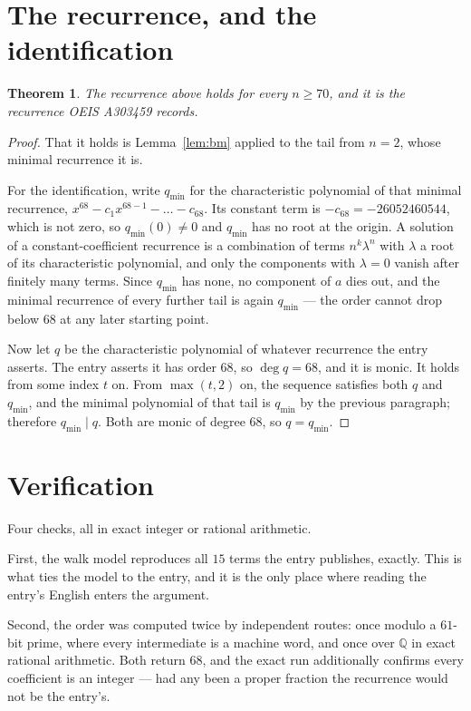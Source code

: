 \documentclass[11pt,a4paper]{article}
\theoremstyle{plain}
\newtheorem{theorem}{Theorem}
\theoremstyle{definition}
\begin{document}
\section{The recurrence, and the identification}

\begin{theorem}
The recurrence above holds for every $n\ge70$, and it is the recurrence OEIS A303459 records.
\end{theorem}

\begin{proof}
That it holds is Lemma~\ref{lem:bm} applied to the tail from $n=2$, whose minimal
recurrence it is.

For the identification, write $q_{\min}$ for the characteristic polynomial of that minimal
recurrence, $x^{68}-c_1x^{68-1}-\dots-c_{68}$. Its constant term is
$-c_{68}=-26052460544$, which is not zero, so $q_{\min}(0)\neq0$ and $q_{\min}$ has no
root at the origin. A solution of a constant-coefficient recurrence is a combination of terms
$n^{k}\lambda^{n}$ with $\lambda$ a root of its characteristic polynomial, and only the
components with $\lambda=0$ vanish after finitely many terms. Since $q_{\min}$ has none, no
component of $a$ dies out, and the minimal recurrence of every further tail is again
$q_{\min}$ --- the order cannot drop below $68$ at any later starting point.

Now let $q$ be the characteristic polynomial of whatever recurrence the entry asserts. The
entry asserts it has order $68$, so $\deg q=68$, and it is monic. It holds from some
index $t$ on. From $\max(t,2)$ on, the sequence satisfies both $q$ and $q_{\min}$, and
the minimal polynomial of that tail is $q_{\min}$ by the previous paragraph; therefore
$q_{\min}\mid q$. Both are monic of degree $68$, so $q=q_{\min}$.
\end{proof}

\section{Verification}

Four checks, all in exact integer or rational arithmetic.

First, the walk model reproduces all $15$ terms the entry publishes, exactly. This is
what ties the model to the entry, and it is the only place where reading the entry's English
enters the argument.

Second, the order was computed twice by independent routes: once modulo a $61$-bit prime, where
every intermediate is a machine word, and once over $\mathbb{Q}$ in exact rational arithmetic.
Both return $68$, and the exact run additionally confirms every coefficient is an integer
--- had any been a proper fraction the recurrence would not be the entry's.
\end{document}
